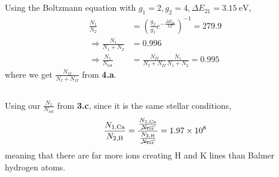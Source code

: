 \documentclass{article}
\begin{document}
\subsection{}

Using the Boltzmann equation with \(g_1 = 2, g_2 = 4, \Delta E_{21} = \SI{3.15}{\electronvolt}\),
\begin{align}
    \frac{N_1}{N_2} &= \left(\frac{g_2}{g_1} e^{-\frac{\Delta E_{21}}{kT}}\right)^{-1} = \num{279.9} \\
    \Rightarrow \frac{N_1}{N_1 + N_2} &= \num{0.996} \\
    \Rightarrow \frac{N_1}{N_{tot}} &= \frac{N_{II}}{N_I + N_{II}} \frac{N_1}{N_1 + N_2} = \num{0.995}
\end{align}
where we get \(\frac{N_{II}}{N_I + N_{II}}\) from \textbf{4.a}.

\subsection{}

Using our \(\frac{N_1}{N_{tot}}\) from \textbf{3.c}, since it is the same stellar conditions,
\begin{equation}
    \frac{N_{1, \ce{Ca}}}{N_{2, \ce{H}}} = \frac{\frac{N_{1, \ce{Ca}}}{\cancel{N_{tot}}}}{\frac{N_{2, \ce{H}}}{\cancel{N_{tot}}}} = \num{1.97e+8}
\end{equation}
meaning that there are far more  ions creating H and K lines than Balmer hydrogen atoms.
\end{document}
